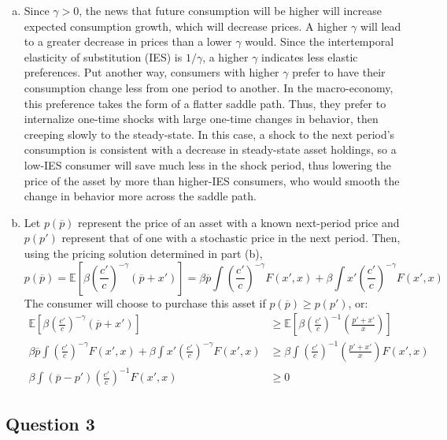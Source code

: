 \documentclass{article}
\newcommand{\E}[1]{\mathbb{E}\left[#1\right]} %
\begin{document}
\begin{enumerate}[(a)]
	\item Since $\gamma>0$, the news that future consumption will be higher will increase expected consumption growth, which will decrease prices. A higher $\gamma$ will lead to a greater decrease in prices than a lower $\gamma$ would. Since the intertemporal elasticity of substitution (IES) is $1/\gamma$, a higher $\gamma$ indicates less elastic preferences. Put another way, consumers with higher $\gamma$ prefer to have their consumption change less from one period to another. In the macro-economy, this preference takes the form of a flatter saddle path. Thus, they prefer to internalize one-time shocks with large one-time changes in behavior, then creeping slowly to the steady-state. In this case, a shock to the next period's consumption is consistent with a decrease in steady-state asset holdings, so a low-IES consumer will save much less in the shock period, thus lowering the price of the asset by more than higher-IES consumers, who would smooth the change in behavior more across the saddle path.
	
	\item Let $p(\overline{p})$ represent the price of an asset with a known next-period price and $p(p')$ represent that of one with a stochastic price in the next period. Then, using the pricing solution determined in part (b),
		\[
			p(\overline{p}) = \E{\beta \left(\frac{c'}{c}\right)^{-\gamma}(\overline{p}+x')} 
							= \beta\overline{p}\int \left(\frac{c'}{c}\right)^{-\gamma}F(x',x) + \beta\int x'\left(\frac{c'}{c}\right)^{-\gamma}F(x',x)
		\]
		The consumer will choose to purchase this asset if ${p(\overline{p})\geq p(p')}$, or:
		\begin{align*}
			\E{\beta \left(\frac{c'}{c}\right)^{-\gamma}(\overline{p}+x')} &\geq \E{\beta \left(\frac{c'}{c}\right)^{-1}\left(\frac{p'+x'}{x}\right)}	\\
			\beta\overline{p}\int \left(\frac{c'}{c}\right)^{-\gamma}F(x',x) + \beta\int x'\left(\frac{c'}{c}\right)^{-\gamma}F(x',x) &\geq
				\beta \int\left(\frac{c'}{c}\right)^{-1}\left(\frac{p'+x'}{x}\right)F(x',x)	\\
			\beta\int(\overline{p}-p')\left(\frac{c'}{c}\right)^{-1}F(x',x) &\geq 0
		\end{align*}
	
\end{enumerate}

\pagebreak
\subsection*{Question 3}
\end{document}

